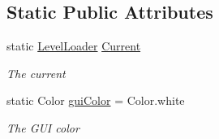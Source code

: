 \subsection*{Static Public Attributes}
\begin{DoxyCompactItemize}
\item 
static \hyperlink{class_level_loader}{Level\+Loader} \hyperlink{class_level_loader_a3f8fbb282f97d8aeaf499d94b0ed6a4b}{Current}
\begin{DoxyCompactList}\small\item\em The current \end{DoxyCompactList}\item 
static Color \hyperlink{class_level_loader_a35d760bc734b8b2c76fb49147ffd7109}{gui\+Color} = Color.\+white
\begin{DoxyCompactList}\small\item\em The G\+UI color \end{DoxyCompactList}\end{DoxyCompactItemize}

